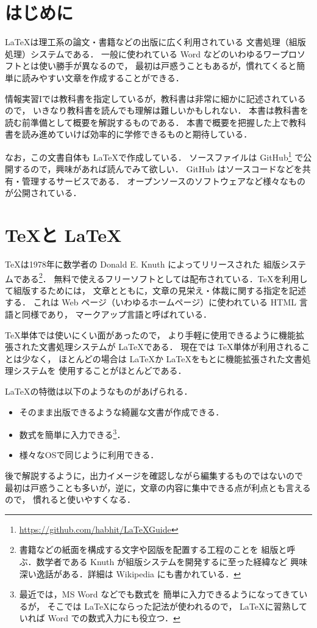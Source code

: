\section{はじめに}

\LaTeX は理工系の論文・書籍などの出版に広く利用されている
文書処理（組版処理）システムである．
一般に使われている Word などのいわゆるワープロソフトとは使い勝手が異なるので，
最初は戸惑うこともあるが，慣れてくると簡単に読みやすい文章を作成することができる．

情報実習Iでは教科書\cite{TeXText}を指定しているが，教科書は非常に細かに記述されているので，
いきなり教科書を読んでも理解は難しいかもしれない．
本書は教科書を読む前準備として概要を解説するものである．
本書で概要を把握した上で教科書を読み進めていけば効率的に学修できるものと期待している．

なお，この文書自体も \LaTeX で作成している．
ソースファイルは GitHub\footnote{\url{https://github.com/habhit/LaTeXGuide}}
で公開するので，興味があれば読んでみて欲しい．
GitHub はソースコードなどを共有・管理するサービスである．
オープンソースのソフトウェアなど様々なものが公開されている．

\section{\TeX と \LaTeX}
\label{sec:TeXandLaTeX}

\TeX は1978年に数学者の Donald E. Knuth によってリリースされた
組版システムである\footnote{書籍などの紙面を構成する文字や図版を配置する工程のことを
組版と呼ぶ．数学者である Knuth が組版システムを開発するに至った経緯など
興味深い逸話がある．詳細は Wikipedia にも書かれている．}．
無料で使えるフリーソフトとしては配布されている．TeXを利用して組版するためには，
文章とともに，文章の見栄え・体裁に関する指定を記述する．
これは Web ページ（いわゆるホームページ）に使われている HTML 言語と同様であり，
マークアップ言語と呼ばれている．

\TeX 単体では使いにくい面があったので，
より手軽に使用できるように機能拡張された文書処理システムが \LaTeX である．
現在では \TeX 単体が利用されることは少なく，
ほとんどの場合は \LaTeX か \LaTeX をもとに機能拡張された文書処理システムを
使用することがほとんどである．

\LaTeX の特徴は以下のようなものがあげられる．
\begin{itemize}
\item そのまま出版できるような綺麗な文書が作成できる．
\item 数式を簡単に入力できる\footnote{最近では，MS Word などでも数式を
簡単に入力できるようになってきているが，
そこでは \LaTeX にならった記法が使われるので，
\LaTeX に習熟していれば Word での数式入力にも役立つ．}．
\item 様々なOSで同じように利用できる．
\end{itemize}
後で解説するように，出力イメージを確認しながら編集するものではないので
最初は戸惑うことも多いが，逆に，文章の内容に集中できる点が利点とも言えるので，
慣れると使いやすくなる．

